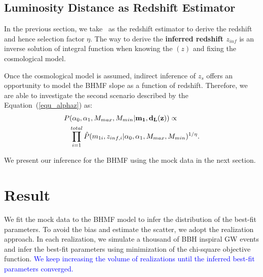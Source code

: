 \documentclass[twocolumn]{aastex62}
\newcommand{\blue}[1]{\textcolor{blue}{#1}}
\begin{document}
\subsection{Luminosity Distance as Redshift Estimator} 
\label{sec_dl_z}
In the previous section, we take \dl\ as the redshift estimator to derive the redshift and hence selection factor $\eta$. The way to derive the \textbf{inferred redshift $z_{inf}$} is an inverse solution of integral function when knowing the \dl$(z)$ and fixing the cosmological model.

Once the cosmological model is assumed, indirect inference of $z_s$ offers an opportunity to model the BHMF slope as a function of redshift. Therefore, we are able to investigate the second scenario described by the Equation~(\ref{equ_alphaz}) as:
 \begin{equation} \label{equ_lik_alphaz}
 \begin{split}
 P&(\alpha_0, \alpha_1, M_{max}, M_{min}{\bf |m_{1},d_L(z)}) \propto \\
  &\prod_{i=1}^{total} \hat{P}(m_{1i}, z_{inf,i} |\alpha_0, \alpha_1, M_{max}, M_{min})^{1/\eta}.
  \end{split}
 \end{equation}
 
 We present our inference for the BHMF using the mock data in the next section. 


\vspace{1cm}
\section{Result}\label{sec_result}
We fit the mock data to the BHMF model to infer the distribution of the best-fit parameters. To avoid the bias and estimate the scatter, we adopt the realization approach. In each realization, we simulate a thousand of BBH inspiral GW events and infer the best-fit parameters using minimization of the chi-square objective function. \blue{We keep increasing the volume of realizations until the inferred best-fit parameters converged.}
\end{document}
